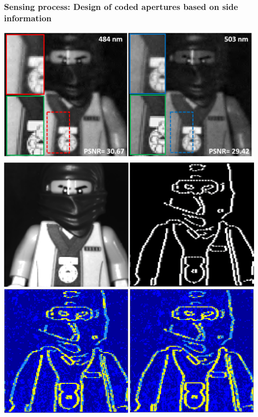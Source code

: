 \documentclass{beamer}
\begin{document}
\begin{frame}
\frametitle{Sensing process: Design of coded apertures based on side information}

\includegraphics[scale=0.25]{FiguresUpd/Rec.png}
\hspace{20pt}
\includegraphics[scale=0.255]{FiguresUpd/Border.png}
\vspace{15pt}
\centering
\includegraphics[scale=0.25]{FiguresUpd/Correlation.png}


\end{frame}
\end{document}
